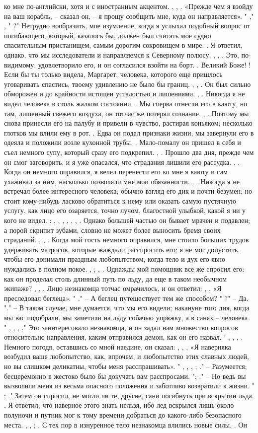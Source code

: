 ко мне по-английски, хотя и с иностранным акцентом. , , . «Прежде чем я взойду на ваш корабль, – сказал он, – я прощу сообщить мне, куда он направляется». " ," , " ?" Нетрудно вообразить, мое изумление, когда я услыхал подобный вопрос от погибающего, который, казалось бы, должен был считать мое судно спасительным пристанищем, самым дорогим сокровищем в мире. . Я ответил, однако, что мы исследователи и направляемся к Северному полюсу. , , . Это, по-видимому, удовлетворило его, и он согласился взойти на борт. . Великий Боже! ! Если бы ты только видела, Маргарет, человека, которого еще пришлось уговаривать спастись, твоему удивлению не было бы границ. , , . Он был сильно обморожен и до крайности истощен усталостью и лишениями. , . Никогда я не видел человека в столь жалком состоянии. . Мы сперва отнесли его в каюту, но там, лишенный свежего воздуха, он тотчас же потерял сознание. , . Поэтому мы снова принесли его на палубу и привели в чувство, растирая коньяком; несколько глотков мы влили ему в рот. . Едва он подал признаки жизни, мы завернули его в одеяла и положили возле кухонной трубы. . Мало-помалу он пришел в себя и съел немного супу, который сразу его подкрепил. , . Прошло два дня, прежде чем он смог заговорить, и я уже опасался, что страдания лишили его рассудка. , . Когда он немного оправился, я велел перенести его ко мне я каюту и сам ухаживал за ним, насколько позволяли мне мои обязанности. , . Никогда я не встречал более интересного человека; обычно взгляд его дик и почти безумен; но стоит кому-нибудь ласково обратиться к нему или оказать самую пустячную услугу, как лицо его озаряется, точно лучом, благостной улыбкой, какой я ни у кого не видел. : , , , , , , . Однако большей частью он бывает мрачен и подавлен; а порой скрипит зубами, словно не может более выносить бремя своих страданий. , , . Когда мой гость немного оправился, мне стоило больших трудов удерживать матросов, которые жаждали расспросить его; я не мог допустить, чтобы его донимали праздным любопытством, когда тело и дух его явно нуждались в полном покое. , ; , . Однажды мой помощник все же спросил его: как он проделал столь длинный путь по льду, да еще в таком необычном экипаже? , , . Лицо незнакомца тотчас омрачилось, и он ответил: , , «Я преследовал беглеца». " ." – А беглец путешествует тем же способом? " ?" – Да. "." – В таком случае, мне думается, что мы его видели; накануне того дня, когда мы вас подобрали, мы заметили на льду собачью упряжку, а в санях – человека. " , , , ." Это заинтересовало незнакомца, и он задал нам множество вопросов относительно направления, каким отправился демон, как он его назвал. ' , , , . Немного погодя, оставшись со мной наедине, он сказал: , , , «Я наверняка возбудил ваше любопытство, как, впрочем, и любопытство этих славных людей, но вы слишком деликатны, чтобы меня расспрашивать». " , , , ; ." – Разумеется; бесцеремонно в жестоко было бы докучать вам расспросами. "; ." – Но ведь вы вызволили меня из весьма опасного положения и заботливо возвратили к жизни. " ; ." Затем он спросил, не могли ли те, другие, сани погибнуть при вскрытии льда. . Я ответил, что наверное этого знать нельзя, ибо лед вскрылся лишь около полуночи и путник мог к тому времени добраться до какого-либо безопасного места. , , ; . С тех пор в изнуренное тело незнакомца влились новые силы. . Он 